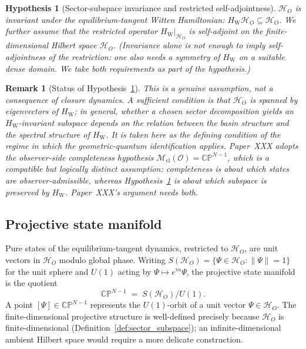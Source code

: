 \documentclass[12pt]{article}
\newtheorem{remark}[theorem]{Remark}
\newtheorem{hypothesis}[theorem]{Hypothesis}
\newcommand{\HW}{H_{\mathrm{W}}}
\newcommand{\Mcl}{\mathcal{M}_{\mathrm{cl}}}
\newcommand{\Ocal}{\mathcal{O}}
\begin{document}
\begin{hypothesis}[Sector-subspace invariance and restricted self-adjointness]\label{hyp:subspace_invariance}
$\mathcal{H}_O$ is invariant under the equilibrium-tangent Witten Hamiltonian: $\HW \mathcal{H}_O \subseteq \mathcal{H}_O$. We further assume that the restricted operator $\HW|_{\mathcal{H}_O}$ is self-adjoint on the finite-dimensional Hilbert space $\mathcal{H}_O$. (Invariance alone is not enough to imply self-adjointness of the restriction: one also needs a symmetry of $\HW$ on a suitable dense domain. We take both requirements as part of the hypothesis.)
\end{hypothesis}

\begin{remark}[Status of Hypothesis~\ref{hyp:subspace_invariance}]\label{rem:hyp_status}
This is a genuine assumption, not a consequence of closure dynamics. A sufficient condition is that $\mathcal{H}_O$ is spanned by eigenvectors of $\HW$; in general, whether a chosen sector decomposition yields an $\HW$-invariant subspace depends on the relation between the basin structure and the spectral structure of $\HW$. It is taken here as the defining condition of the regime in which the geometric-quantum identification applies. Paper~XXX adopts the observer-side completeness hypothesis $\Mcl(\Ocal) = \mathbb{CP}^{N-1}$, which is a compatible but logically distinct assumption: completeness is about which states are observer-admissible, whereas Hypothesis~\ref{hyp:subspace_invariance} is about which subspace is preserved by $\HW$. Paper~XXX's argument needs both.
\end{remark}

\subsection{Projective state manifold}\label{subsec:cpN}

Pure states of the equilibrium-tangent dynamics, restricted to $\mathcal{H}_O$, are unit vectors in $\mathcal{H}_O$ modulo global phase. Writing $S(\mathcal{H}_O) = \{\Psi \in \mathcal{H}_O : \|\Psi\| = 1\}$ for the unit sphere and $U(1)$ acting by $\Psi \mapsto e^{i\alpha}\Psi$, the projective state manifold is the quotient
\begin{equation}\label{eq:CPN}
    \mathbb{CP}^{N-1} \;=\; S(\mathcal{H}_O) / U(1).
\end{equation}
A point $[\Psi] \in \mathbb{CP}^{N-1}$ represents the $U(1)$-orbit of a unit vector $\Psi \in \mathcal{H}_O$. The finite-dimensional projective structure is well-defined precisely because $\mathcal{H}_O$ is finite-dimensional (Definition~\ref{def:sector_subspace}); an infinite-dimensional ambient Hilbert space would require a more delicate construction.
\end{document}
